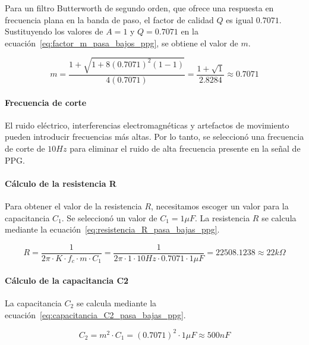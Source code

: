         Para un filtro Butterworth de segundo orden, que ofrece una respuesta en frecuencia plana en la banda de paso, el factor de calidad $Q$ es igual $0.7071$. Sustituyendo los valores de $A = 1$ y $Q = 0.7071$ en la ecuación~\ref{eq:factor_m_pasa_bajos_ppg}, se obtiene el valor de $m$.

        \begin{equation}
            \label{eq:factor_m_pasa_bajos_ppg_valor}
            m = \frac{1+\sqrt{1+8(0.7071)^2(1-1)}}{4(0.7071)} = \frac{1 + \sqrt{1}}{2.8284}\approx 0.7071
        \end{equation}

        \paragraph{Frecuencia de corte}
        El ruido eléctrico, interferencias electromagnéticas y artefactos de movimiento pueden introducir frecuencias más altas. Por lo tanto, se seleccionó una frecuencia de corte de $10 Hz$ para eliminar el ruido de alta frecuencia presente en la señal de PPG.

        \paragraph{Cálculo de la resistencia R}
        Para obtener el valor de la resistencia $R$, necesitamos escoger un valor para la capacitancia $C_1$. Se seleccionó un valor de $C_1 = 1 \mu F$. La resistencia $R$ se calcula mediante la ecuación~\ref{eq:resistencia_R_pasa_bajas_ppg}.

        \begin{equation}
            \label{eq:resistencia_R_pasa_bajas_ppg}
            R = \frac{1}{2\pi \cdot K \cdot f_c \cdot m \cdot C_1} = \frac{1}{2\pi \cdot 1 \cdot 10 Hz \cdot 0.7071 \cdot 1 \mu F} = 22508.1238 \approx 22 k\Omega
        \end{equation}

        \paragraph{Cálculo de la capacitancia C2}
        La capacitancia $C_2$ se calcula mediante la ecuación~\ref{eq:capacitancia_C2_pasa_bajas_ppg}.

        \begin{equation}
            \label{eq:capacitancia_C2_pasa_bajas_ppg}
            C_2 = m^2 \cdot C_1 = (0.7071)^2 \cdot 1 \mu F \approx 500 nF
        \end{equation}

